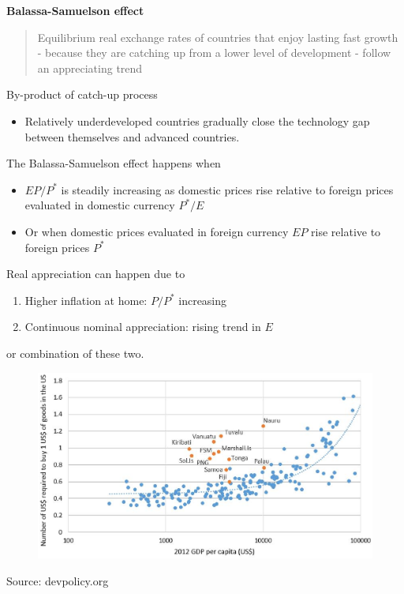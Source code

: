 \documentclass{beamer}
\begin{document}
\begin{frame}
  \textbf{Balassa-Samuelson effect}
  \begin{quote}
    Equilibrium real exchange rates of countries that enjoy lasting fast growth - because they are catching up from a lower level of development - follow an appreciating trend
  \end{quote}
  \medskip
  By-product of catch-up process 
  \begin{itemize}
    \item Relatively underdeveloped countries gradually close the technology gap between themselves and advanced countries.
  \end{itemize}  
\end{frame}

\begin{frame}
  The Balassa-Samuelson effect happens when
 \begin{itemize}
    \item $EP/P^*$ is steadily increasing as domestic prices rise relative to foreign prices evaluated in domestic currency $P^*/E$
    \item Or when domestic prices evaluated in foreign currency $EP$ rise relative to foreign prices $P^*$
  \end{itemize}
  \medskip
  Real appreciation can happen due to
  \begin{enumerate}
    \item Higher inflation at home: $P / P^*$ increasing
    \item Continuous nominal appreciation: rising trend in $E$
  \end{enumerate}
  or combination of these two.
\end{frame}

\begin{frame}
  \begin{figure}
    \includegraphics[scale=.5]{expensive_pacific.eps}
  \end{figure}
  Source: devpolicy.org
\end{frame}

\end{document}
